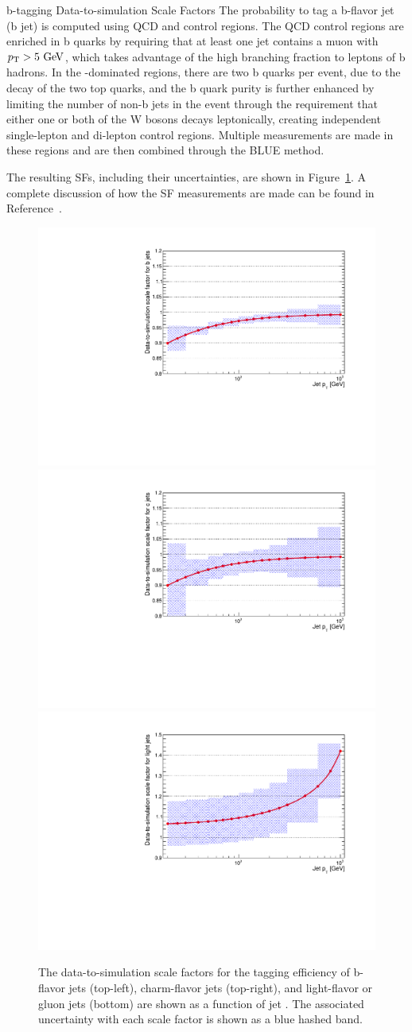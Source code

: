\begin{section}{b-tagging Data-to-simulation Scale Factors}
The probability to tag a b-flavor jet (b jet) is computed using QCD and \ttbar control regions.
The QCD control regions are enriched in b quarks by requiring that at least one jet contains a muon with $p_{\mathrm{T}} > 5~\mathrm{Ge\kern -0.1em V}$, which takes advantage of the high branching fraction to leptons of b hadrons.
In the \ttbar-dominated regions, there are two b quarks per event, due to the decay of the two top quarks, and the b quark purity is further enhanced by limiting the number of non-b jets in the event through the requirement that either one or both of the W bosons decays leptonically, creating independent single-lepton and di-lepton control regions.
Multiple measurements are made in these regions and are then combined through the BLUE method.

The resulting SFs, including their uncertainties, are shown in Figure~\ref{fig:btag_sfs}.
A complete discussion of how the SF measurements are made can be found in Reference~\cite{Sirunyan:2017ezt}.

\begin{figure}[tbp!]
\begin{center}
\includegraphics[angle=0,width=0.45\columnwidth]{fig/sfs_bjet.pdf}
\includegraphics[angle=0,width=0.45\columnwidth]{fig/sfs_cjet.pdf}
\includegraphics[angle=0,width=0.45\columnwidth]{fig/sfs_ljet.pdf}
\end{center}
\caption{The data-to-simulation scale factors for the tagging efficiency of b-flavor jets (top-left), charm-flavor jets (top-right), and light-flavor or gluon jets (bottom) are shown as a function of jet \pT.
The associated uncertainty with each scale factor is shown as a blue hashed band.}
\label{fig:btag_sfs}
\end{figure}


\end{section}
